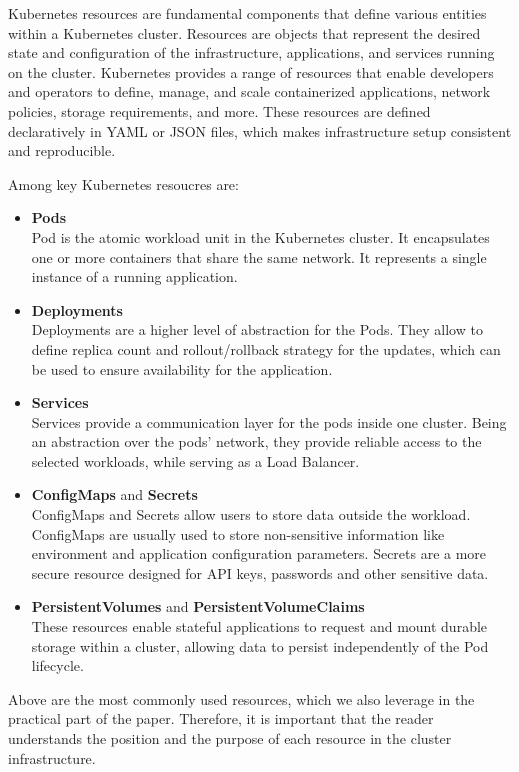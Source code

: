 Kubernetes resources are fundamental components that define various entities within a Kubernetes cluster. Resources are objects that represent the desired state and configuration of the infrastructure, applications, and services running on the cluster. Kubernetes provides a range of resources that enable developers and operators to define, manage, and scale containerized applications, network policies, storage requirements, and more. These resources are defined declaratively in YAML or JSON files, which makes infrastructure setup consistent and reproducible.

Among key Kubernetes resoucres are:
\begin{itemize}
    \item \textbf{Pods} \\
        Pod is the atomic workload unit in the Kubernetes cluster. It encapsulates one or more containers that share the same network. It represents a single instance of a running application.
    \item \textbf{Deployments} \\
        Deployments are a higher level of abstraction for the Pods. They allow to define replica count and rollout/rollback strategy for the updates, which can be used to ensure availability for the application.
    \item \textbf{Services} \\
        Services provide a communication layer for the pods inside one cluster. Being an abstraction over the pods' network, they provide reliable access to the selected workloads, while serving as a Load Balancer. 
    \item \textbf{ConfigMaps} and \textbf{Secrets} \\
        ConfigMaps and Secrets allow users to store data outside the workload. ConfigMaps are usually used to store non-sensitive information like environment and application configuration parameters. Secrets are a more secure resource designed for API keys, passwords and other sensitive data.
    \item \textbf{PersistentVolumes} and \textbf{PersistentVolumeClaims} \\
        These resources enable stateful applications to request and mount durable storage within a cluster, allowing data to persist independently of the Pod lifecycle.
\end{itemize}

Above are the most commonly used resources, which we also leverage in the practical part of the paper. Therefore, it is important that the reader understands the position and the purpose of each resource in the cluster infrastructure.

